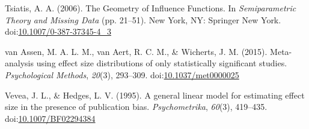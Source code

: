 \documentclass[man,floatsintext]{apa6}
\begin{document}
\leavevmode\hypertarget{ref-tsiatis2006GeometryInfluenceFunctions}{}%
Tsiatis, A. A. (2006). The Geometry of Influence Functions. In \emph{Semiparametric Theory and Missing Data} (pp. 21--51). New York, NY: Springer New York. doi:\href{https://doi.org/10.1007/0-387-37345-4_3}{10.1007/0-387-37345-4\_3}

\leavevmode\hypertarget{ref-vanassen2015MetaanalysisUsingEffect}{}%
van Assen, M. A. L. M., van Aert, R. C. M., \& Wicherts, J. M. (2015). Meta-analysis using effect size distributions of only statistically significant studies. \emph{Psychological Methods}, \emph{20}(3), 293--309. doi:\href{https://doi.org/10.1037/met0000025}{10.1037/met0000025}

\leavevmode\hypertarget{ref-vevea1995GeneralLinearModel}{}%
Vevea, J. L., \& Hedges, L. V. (1995). A general linear model for estimating effect size in the presence of publication bias. \emph{Psychometrika}, \emph{60}(3), 419--435. doi:\href{https://doi.org/10.1007/BF02294384}{10.1007/BF02294384}

\endgroup
\end{document}
